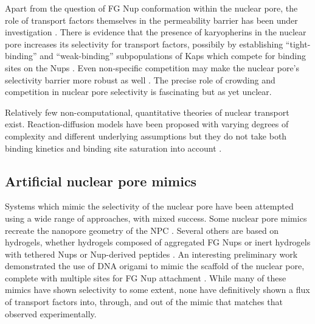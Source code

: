Apart from the question of FG Nup conformation within the nuclear pore, the role of transport factors themselves in the permeability barrier has been under investigation \cite{kapinos18,kapinos17,schleicher14,kapinos14}.  There is evidence that the presence of karyopherins in the nuclear pore increases its selectivity for transport factors, possibily by establishing ``tight-binding'' and ``weak-binding'' subpopulations of Kaps which compete for binding sites on the Nups \cite{wagner15}.  Even non-specific competition may make the nuclear pore's selectivity barrier more robust as well \cite{tetenbaum-novatt12,zilman09,zilman10,timney06}.  The precise role of crowding and competition in nuclear pore selectivity is fascinating but as yet unclear.


Relatively few non-computational, quantitative theories of nuclear transport exist.  Reaction-diffusion models have been proposed with varying degrees of complexity and different underlying assumptions but they do not take both binding kinetics and binding site saturation into account \cite{yang18,zilman07}.




\subsection{Artificial nuclear pore mimics}

Systems which mimic the selectivity of the nuclear pore have been attempted using a wide range of approaches, with mixed success.  Some nuclear pore mimics recreate the nanopore geometry of the NPC \cite{jovanovic-talisman09,ananth18a}.  Several others are based on hydrogels, whether hydrogels composed of aggregated FG Nups \cite{frey07,ader10, kim15} or inert hydrogels with tethered Nups or Nup-derived peptides \cite{yang18,friedman16a}. 
An interesting preliminary work demonstrated the use of DNA origami to mimic the scaffold of the nuclear pore, complete with multiple sites for FG Nup attachment \cite{fisher18}.
 While many of these mimics have shown selectivity to some extent, none have definitively shown a flux of transport factors into, through, and out of the mimic that matches that observed experimentally.  

